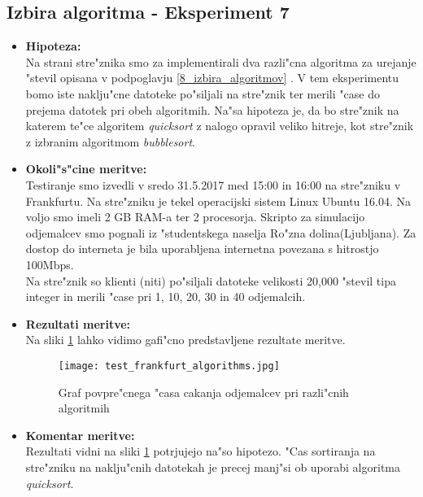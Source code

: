     \subsection{Izbira algoritma - Eksperiment 7}
    \begin{itemize}
    	\item \textbf{Hipoteza: }  \\
    		Na strani stre"znika smo za implementirali dva razli"cna algoritma za urejanje "stevil opisana v podpoglavju \ref{8_izbira_algoritmov} . V tem eksperimentu bomo iste naklju"cne datoteke po"siljali na stre"znik ter merili "case do prejema datotek pri obeh algoritmih.
		Na"sa hipoteza je, da bo stre"znik na katerem te"ce algoritem \textit{quicksort} z nalogo opravil veliko hitreje, kot stre"znik z izbranim algoritmom \textit{bubblesort}.
    			
    	\item \textbf{Okoli"s"cine meritve: } \\
    		Testiranje smo izvedli v sredo 31.5.2017 med 15:00 in 16:00 na stre"zniku v Frankfurtu. Na stre"zniku je tekel operacijski sistem Linux Ubuntu 16.04. Na voljo smo imeli 2 GB RAM-a ter 2 procesorja. Skripto za simulacijo odjemalcev smo pognali iz "studentskega naselja Ro"zna dolina(Ljubljana). Za dostop do interneta je bila uporabljena internetna povezana s hitrostjo 100Mbps.\\ Na stre"znik so klienti (niti) po"siljali datoteke velikosti 20,000 "stevil tipa integer in merili "case pri 1, 10, 20, 30 in 40 odjemalcih.
    
     	\item \textbf{Rezultati meritve: }  \\
		Na sliki \ref{8_graf_algorithms} lahko vidimo gafi"cno predstavljene rezultate meritve.
    		\begin{figure}[h]
  		\centering
  		  \texttt{[image: test\_frankfurt\_algorithms.jpg]}
  		\caption{Graf povpre"cnega "casa cakanja odjemalcev pri razli"cnih algoritmih }
  		\label{8_graf_algorithms}
		\end{figure}
    		\newpage

    	\item \textbf{Komentar meritve: } \\ 
    		Rezultati vidni na sliki  \ref{8_graf_algorithms} potrjujejo na"so hipotezo. "Cas sortiranja na stre"zniku na naklju"cnih datotekah je precej manj"si ob uporabi algoritma \textit{quicksort}.  
    \end{itemize}


